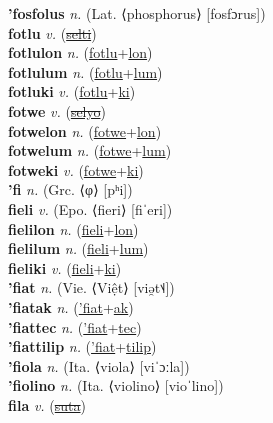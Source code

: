 \textbf{'fosfolus} \textit{n.} (Lat. ⟨phosphorus⟩ [fosfɔrus])
 \label{'fosfolus} \\
\textbf{fotlu} \textit{v.} (\hyperref[selti]{\sout{selti}})
 \label{fotlu} \\
\textbf{fotlulon} \textit{n.} (\hyperref[fotlu]{fotlu}+\hyperref[lon]{lon})
 \label{fotlulon} \\
\textbf{fotlulum} \textit{n.} (\hyperref[fotlu]{fotlu}+\hyperref[lum]{lum})
 \label{fotlulum} \\
\textbf{fotluki} \textit{v.} (\hyperref[fotlu]{fotlu}+\hyperref[ki]{ki})
 \label{fotluki} \\
\textbf{fotwe} \textit{v.} (\hyperref[selyo]{\sout{selyo}})
 \label{fotwe} \\
\textbf{fotwelon} \textit{n.} (\hyperref[fotwe]{fotwe}+\hyperref[lon]{lon})
 \label{fotwelon} \\
\textbf{fotwelum} \textit{n.} (\hyperref[fotwe]{fotwe}+\hyperref[lum]{lum})
 \label{fotwelum} \\
\textbf{fotweki} \textit{v.} (\hyperref[fotwe]{fotwe}+\hyperref[ki]{ki})
 \label{fotweki} \\
\textbf{'fi} \textit{n.} (Grc. ⟨φ⟩ [pʰi])
 \label{'fi} \\
\textbf{fieli} \textit{v.} (Epo. ⟨fieri⟩ [fiˈeri])
 \label{fieli} \\
\textbf{fielilon} \textit{n.} (\hyperref[fieli]{fieli}+\hyperref[lon]{lon})
 \label{fielilon} \\
\textbf{fielilum} \textit{n.} (\hyperref[fieli]{fieli}+\hyperref[lum]{lum})
 \label{fielilum} \\
\textbf{fieliki} \textit{v.} (\hyperref[fieli]{fieli}+\hyperref[ki]{ki})
 \label{fieliki} \\
\textbf{'fiat} \textit{n.} (Vie. ⟨Việt⟩ [viə̯t˦˨])
 \label{'fiat} \\
\textbf{'fiatak} \textit{n.} (\hyperref['fiat]{'fiat}+\hyperref[ak]{ak})
 \label{'fiatak} \\
\textbf{'fiattec} \textit{n.} (\hyperref['fiat]{'fiat}+\hyperref[tec]{tec})
 \label{'fiattec} \\
\textbf{'fiattilip} \textit{n.} (\hyperref['fiat]{'fiat}+\hyperref[tilip]{tilip})
 \label{'fiattilip} \\
\textbf{'fiola} \textit{n.} (Ita. ⟨viola⟩ [viˈɔːla])
 \label{'fiola} \\
\textbf{'fiolino} \textit{n.} (Ita. ⟨violino⟩ [vioˈlino])
 \label{'fiolino} \\
\textbf{fila} \textit{v.} (\hyperref[suta]{\sout{suta}})
